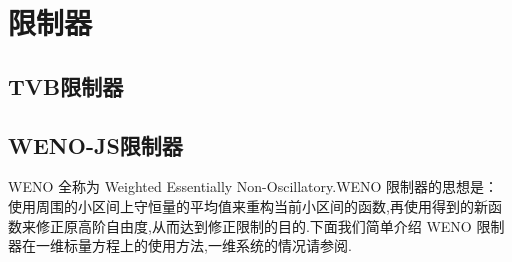 \documentclass{book}
\begin{document}
\section{限制器}
\subsection{TVB限制器}

\subsection{WENO-JS限制器}
WENO 全称为 Weighted Essentially Non-Oscillatory.WENO 限制器的思想是：使用周围的小区间上守恒量的平均值来重构当前小区间的函数,再使用得到的新函数来修正原高阶自由度,从而达到修正限制的目的.下面我们简单介绍 WENO 限制器在一维标量方程上的使用方法,一维系统的情况请参阅\cite{WENO-js1}.
\end{document}
